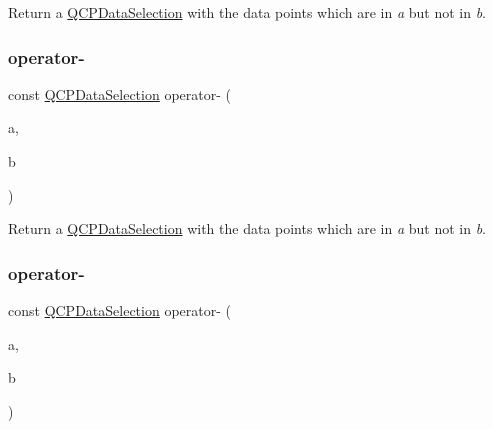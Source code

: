 Return a \hyperlink{class_q_c_p_data_selection}{Q\+C\+P\+Data\+Selection} with the data points which are in {\itshape a} but not in {\itshape b}. \mbox{\label{class_q_c_p_data_selection_a726652cb9ed840e3025435cc2c266468}} 
\subsubsection{\texorpdfstring{operator-\/}{operator-}\hspace{0.1cm}{\footnotesize\ttfamily [2/4]}}
{\footnotesize\ttfamily const \hyperlink{class_q_c_p_data_selection}{Q\+C\+P\+Data\+Selection} operator-\/ (\begin{DoxyParamCaption}\item[{const \hyperlink{class_q_c_p_data_range}{Q\+C\+P\+Data\+Range} \&}]{a,  }\item[{const \hyperlink{class_q_c_p_data_selection}{Q\+C\+P\+Data\+Selection} \&}]{b }\end{DoxyParamCaption})\hspace{0.3cm}{\ttfamily [friend]}}

Return a \hyperlink{class_q_c_p_data_selection}{Q\+C\+P\+Data\+Selection} with the data points which are in {\itshape a} but not in {\itshape b}. \mbox{\label{class_q_c_p_data_selection_a32c5784ac70946f09a09b2dd19816b78}} 
\subsubsection{\texorpdfstring{operator-\/}{operator-}\hspace{0.1cm}{\footnotesize\ttfamily [3/4]}}
{\footnotesize\ttfamily const \hyperlink{class_q_c_p_data_selection}{Q\+C\+P\+Data\+Selection} operator-\/ (\begin{DoxyParamCaption}\item[{const \hyperlink{class_q_c_p_data_selection}{Q\+C\+P\+Data\+Selection} \&}]{a,  }\item[{const \hyperlink{class_q_c_p_data_range}{Q\+C\+P\+Data\+Range} \&}]{b }\end{DoxyParamCaption})\hspace{0.3cm}{\ttfamily [friend]}}

